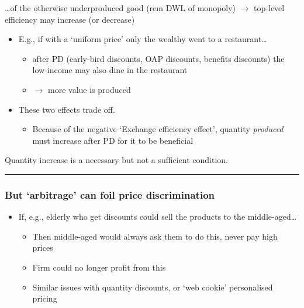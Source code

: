 \documentclass[]{article}
\providecommand{\tightlist}{%
  \setlength{\itemsep}{0pt}\setlength{\parskip}{0pt}}
\begin{document}
\ldots{}of the otherwise underproduced good (rem DWL of monopoly) \(\rightarrow\) top-level efficiency may increase (or decrease)

\begin{itemize}
\tightlist
\item
  E.g., if with a `uniform price' only the wealthy went to a restaurant\ldots{}

  \begin{itemize}
  \tightlist
  \item
    after PD (early-bird discounts, OAP discounts, benefits discounts) the low-income may also dine in the restaurant
  \item
    \(\rightarrow\) more value is produced
  \end{itemize}
\item
  These two effects trade off.

  \begin{itemize}
  \tightlist
  \item
    Because of the negative `Exchange efficiency effect', quantity \emph{produced} must increase after PD for it to be beneficial
  \end{itemize}
\end{itemize}

Quantity increase is a necessary but not a sufficient condition.

\begin{center}\rule{0.5\linewidth}{\linethickness}\end{center}

\hypertarget{but-arbitrage-can-foil-price-discrimination}{%
\subsubsection{But `arbitrage' can foil price discrimination}\label{but-arbitrage-can-foil-price-discrimination}}

\begin{itemize}
\tightlist
\item
  If, e.g., elderly who get discounts could sell the products to the middle-aged\ldots{}

  \begin{itemize}
  \tightlist
  \item
    Then middle-aged would always ask them to do this, never pay high prices
  \item
    Firm could no longer profit from this
  \item
    Similar issues with quantity discounts, or `web cookie' personalised pricing
  \end{itemize}
\end{itemize}
\end{document}
